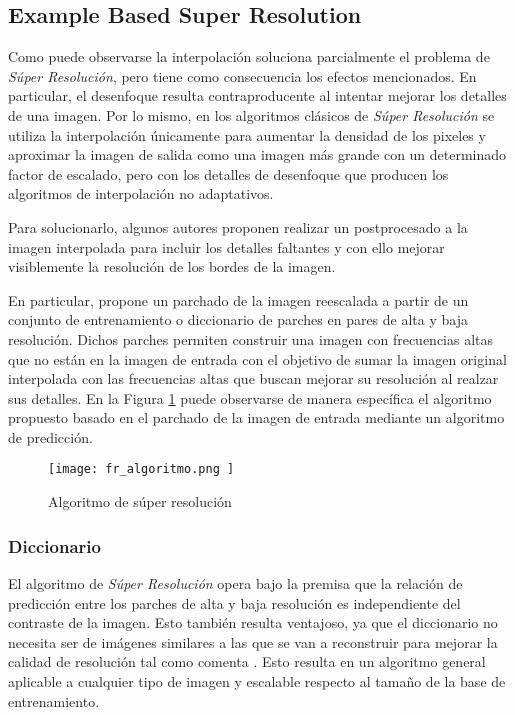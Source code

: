 \subsection{Example Based Super Resolution}
\noindent
Como puede observarse la interpolación soluciona parcialmente el problema de
\emph{Súper Resolución}, pero tiene como consecuencia los efectos mencionados. En
particular, el desenfoque resulta contraproducente al intentar mejorar los 
detalles de una imagen. Por lo mismo, en los algoritmos clásicos de \emph{Súper Resolución}
se utiliza la interpolación únicamente para aumentar la densidad de los pixeles
y aproximar la imagen de salida como una imagen más grande con un determinado 
factor de escalado, pero con los detalles de desenfoque que producen los 
algoritmos de interpolación no adaptativos. 

Para solucionarlo, algunos autores proponen realizar un postprocesado a la imagen 
interpolada para incluir los detalles faltantes y con ello mejorar visiblemente 
la resolución de los bordes de la imagen. 

En particular, \cite{freeman} propone un parchado de la imagen reescalada a partir
de un conjunto de entrenamiento o diccionario de parches en pares de alta
y baja resolución. Dichos parches permiten construir una imagen con frecuencias
altas que no están en la imagen de entrada con el objetivo de sumar la imagen
original interpolada con las frecuencias altas que buscan mejorar su resolución
al realzar sus detalles. En la Figura \ref{fig:fr_algoritmo} puede observarse de
manera específica el algoritmo propuesto basado en el parchado de la imagen de 
entrada mediante un algoritmo de predicción.

\begin{figure}[H]
    \texttt{[image:  fr\_algoritmo.png ]}
    \centering
    \caption{ Algoritmo de súper resolución }
    \label{fig:fr_algoritmo}
\end{figure}

\subsubsection{Diccionario}
\noindent
El algoritmo de \emph{Súper Resolución} \cite{freeman}
opera bajo la premisa que la relación
de predicción entre los parches de alta y baja resolución es independiente del 
contraste de la imagen. Esto también resulta ventajoso, ya que el diccionario 
no necesita ser de imágenes similares a las que se van a reconstruir para 
mejorar la calidad de resolución tal como comenta \cite{diccionario_shuji}.
Esto resulta en un algoritmo general aplicable a cualquier tipo de imagen
y escalable respecto al tamaño de la base de entrenamiento.

